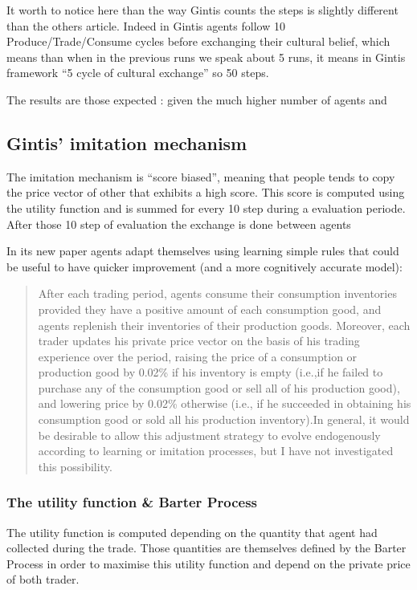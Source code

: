 \documentclass[a4paper]{article}
\begin{document}
It worth to notice here than the way Gintis counts the steps is slightly different than the others article. Indeed in Gintis agents follow 10 Produce/Trade/Consume cycles before exchanging their cultural belief, which means than when in the previous runs we speak about 5 runs, it means in Gintis framework ``5 cycle of cultural exchange'' so 50 steps.

The results are those expected : given the much higher number of agents and 


\subsection{Gintis' imitation mechanism}
The imitation mechanism is ``score biased'', meaning that people tends to copy the price vector of other that exhibits a high score. This score is computed using the utility function and is summed for every 10 step during a evaluation periode. After those 10 step of evaluation the exchange is done between agents  

In its new paper agents adapt themselves using learning simple rules that could be useful to have quicker improvement (and a more cognitively accurate model):

\begin{quotation}
	After each trading period, agents consume their consumption inventories provided they have a positive amount of each consumption good, and agents replenish their inventories of their production goods. Moreover, each trader updates his private price vector on the basis of his trading experience over the period, raising the price of a consumption or production good by 0.02\% if his inventory is empty (i.e.,if he failed to purchase any of the consumption good or sell all of his production good), and lowering price by 0.02\% otherwise (i.e., if he succeeded in obtaining his consumption good or sold all his production inventory).In general, it would be desirable to allow this adjustment strategy to evolve endogenously according to learning or imitation processes, but I have not investigated this possibility.
	\\\cite[p. 7]{gintis2010thedynamicsofgeneralizedmarketexchange}
\end{quotation}

\subsubsection{The utility function \& Barter Process}
The utility function is computed depending on the quantity that agent had collected during the trade. Those quantities are themselves defined by the Barter Process in order to maximise this utility function and depend on the private price of both trader.
\end{document}
